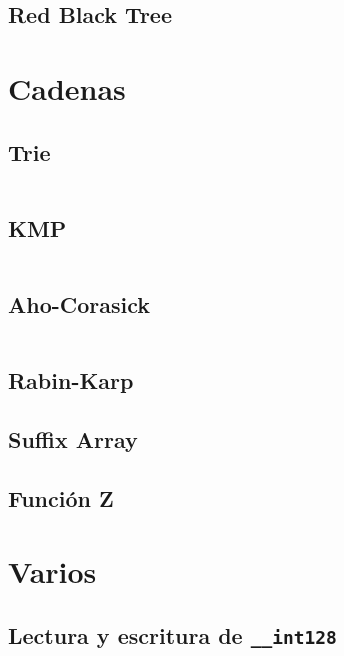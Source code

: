 \documentclass[11pt]{article}
\begin{document}
		\subsection{Red Black Tree}
		
		
	\newpage
	\section{Cadenas}
		\subsection{Trie}
		\inputminted[tabsize=2,breaklines,firstline=144,lastline=196,fontsize=\small]{c++}{strings.cpp}
		
		\subsection{KMP}
		\inputminted[tabsize=2,breaklines,firstline=4,lastline=39,fontsize=\small]{c++}{strings.cpp}
		
		\subsection{Aho-Corasick}
		\inputminted[tabsize=2,breaklines,firstline=41,lastline=142,fontsize=\small]{c++}{strings.cpp}
		
		\subsection{Rabin-Karp}
		
		
		\subsection{Suffix Array}
		
		
		\subsection{Función Z}
		
	
	\newpage
	\section{Varios}
		\subsection{Lectura y escritura de \texttt{\_\_int128}}
		\inputminted[tabsize=2,breaklines,firstline=46,lastline=83,fontsize=\small]{c++}{misc.cpp}
		
\end{document}
